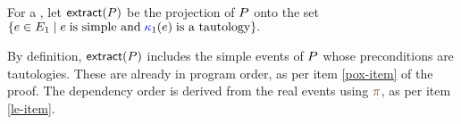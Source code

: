 \begin{definition}
  For a \PwTpo{}, let $\fextract{\aPS}$ be the projection
  of $P$ onto the set
  \begin{math}
    \{e\in E_1\mid\allowbreak e \;\text{is simple and}\; {\color{blue}\kappa}_1(e) \;\text{is a tautology} \}.
  \end{math}
\end{definition}
By definition, $\fextract{\aPS}$ includes the simple events of $P$ whose
preconditions are tautologies.  These are already in program order, as per
item \ref{pox-item} of the proof.  The dependency order is derived from the
real events using $\fmrg{}$, as per item \ref{le-item}.

